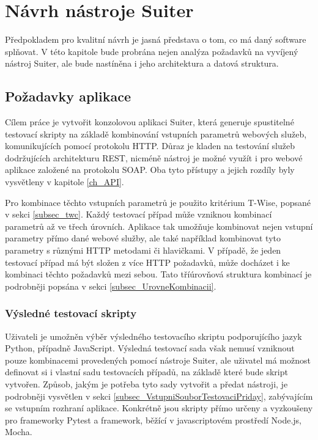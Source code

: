 \chapter{Návrh nástroje Suiter} 
\label{ch_NavrhSuiter}

Předpokladem pro kvalitní návrh je jasná představa o tom, co má daný software splňovat. V této kapitole bude probrána nejen analýza požadavků na vyvíjený nástroj Suiter, ale bude nastíněna i jeho architektura a datová struktura. 


\section{Požadavky aplikace}

Cílem práce je vytvořit konzolovou aplikaci Suiter, která generuje spustitelné testovací skripty na základě kombinování vstupních parametrů webových služeb, komunikujících pomocí protokolu HTTP. Důraz je kladen na testování služeb dodržujících architekturu REST, nicméně nástroj je možné využít i pro webové aplikace založené na protokolu SOAP. Oba tyto přístupy a jejich rozdíly byly vysvětleny v kapitole \ref{ch_API}.

Pro kombinace těchto vstupních parametrů je použito kritérium T-Wise, popsané v sekci \ref{subsec_twc}. Každý testovací případ může vzniknou kombinací parametrů až ve třech úrovních. Aplikace tak umožňuje kombinovat nejen vstupní parametry přímo dané webové služby, ale také například kombinovat tyto parametry s různými HTTP metodami či hlavičkami. V případě, že jeden testovací případ má být složen z více HTTP požadavků, může docházet i ke kombinaci těchto požadavků mezi sebou. Tato tříúrovňová struktura kombinací je podrobněji popsána v sekci \ref{subsec_UrovneKombinacii}.

\subsection*{Výsledné testovací skripty}
\label{subsec_UrovneKombinaci}

Uživateli je umožněn výběr výsledného testovacího skriptu podporujícího jazyk Python, případně JavaScript. Výsledná testovací sada však nemusí vzniknout pouze kombinacemi provedených pomocí nástroje Suiter, ale uživatel má možnost definovat si i vlastní sadu testovacích případů, na základě které bude skript vytvořen. Způsob, jakým je potřeba tyto sady vytvořit a předat nástroji, je podrobněji vysvětlen v sekci \ref{subsec_VstupniSouborTestovaciPriday}, zabývajícím se vstupním rozhraní aplikace. Konkrétně jsou skripty přímo určeny a vyzkoušeny pro frameworky Pytest a framework, běžící v javascriptovém prostředí Node.js, Mocha.   


